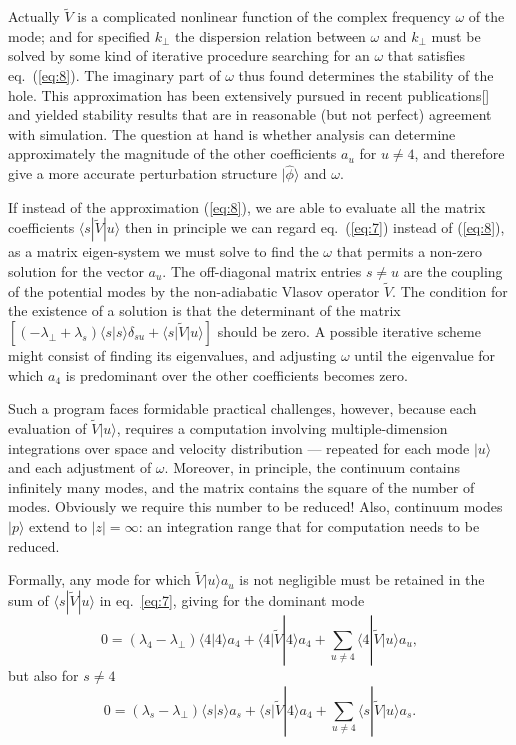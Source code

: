 \documentclass[12pt]{article}
\def\ket#1{|#1\rangle}
\def\bra#1{\langle#1}
\begin{document}
Actually $\tilde{V}$ is a complicated nonlinear function of the complex
frequency $\omega$ of the mode; and for specified $k_\perp$ the
dispersion relation between $\omega$ and $k_\perp$ must be solved by
some kind of iterative procedure searching for an $\omega$ that
satisfies eq.\ (\ref{eq:8}). The imaginary part of $\omega$ thus found
determines the stability of the hole. This approximation has been
extensively pursued in recent publications[] and yielded stability results
that are in reasonable (but not perfect) agreement with simulation.
The question at hand is whether analysis can determine approximately
the magnitude of the other coefficients $a_u$ for $u\not=4$, and
therefore give a more accurate perturbation structure $\ket{\hat\phi}$
and $\omega$.

If instead of the approximation (\ref{eq:8}), we are able to evaluate all the
matrix coefficients $\bra{s}|\tilde{V}\ket{u}$ then in principle we can regard eq.\
(\ref{eq:7}) instead of (\ref{eq:8}), as a matrix eigen-system we must
solve to find the $\omega$ that permits a non-zero solution for the
vector $a_u$. The off-diagonal matrix entries $s\not=u$ are the
coupling of the potential modes by the non-adiabatic Vlasov operator
$\tilde{V}$.  The condition for the existence of a solution is that the
determinant of the matrix
$[(-\lambda_\perp+\lambda_s)\bra{s}\ket{s}\delta_{su}+\bra{s}|\tilde{V}\ket{u}]$ should
be zero. A possible iterative scheme might consist of finding its
eigenvalues, and adjusting $\omega$ until the eigenvalue for which
$a_4$ is predominant over the other coefficients becomes zero.

Such a program faces formidable practical challenges, however, because
each evaluation of $\tilde{V}\ket{u}$, requires a computation involving
multiple-dimension integrations over space and velocity distribution
--- repeated for each mode $\ket{u}$ and each adjustment of $\omega$.
Moreover, in principle, the continuum contains infinitely many modes,
and the matrix contains the square of the number of modes.  Obviously
we require this number to be reduced! Also, continuum modes $\ket{p}$
extend to $|z|=\infty$: an integration range that for computation
needs to be reduced.

Formally, any mode for which $\tilde{V}\ket{u}a_u$ is not negligible
must be retained in the sum of $\bra{s}|\tilde{V}\ket{u}$ in eq.\
\ref{eq:7}, giving for the dominant mode
\begin{equation}
  \label{eq:9}
  0=(\lambda_4-\lambda_\perp)\bra{4}\ket{4}a_4+\bra{4}|\tilde{V}\ket{4}a_4+\sum_{u\not=4}\bra{4}|\tilde{V}\ket{u}a_u,
\end{equation}
but also for $s\not=4$
\begin{equation}
  \label{eq:10}
 0=(\lambda_s-\lambda_\perp)\bra{s}\ket{s}a_s+\bra{s}|\tilde{V}\ket{4}a_4+\sum_{u\not=4}\bra{s}|\tilde{V}\ket{u}a_s.
\end{equation}
\end{document}
